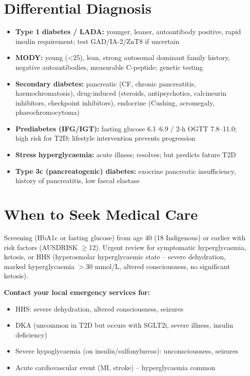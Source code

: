 \section*{Differential Diagnosis}
\begin{itemize}
    \item \textbf{Type 1 diabetes / LADA:} younger, leaner, autoantibody positive, rapid insulin requirement; test GAD/IA-2/ZnT8 if uncertain
    \item \textbf{MODY:} young (<25), lean, strong autosomal dominant family history, negative autoantibodies, measurable C-peptide; genetic testing
    \item \textbf{Secondary diabetes:} pancreatic (CF, chronic pancreatitis, haemochromatosis), drug-induced (steroids, antipsychotics, calcineurin inhibitors, checkpoint inhibitors), endocrine (Cushing, acromegaly, phaeochromocytoma)
    \item \textbf{Prediabetes (IFG/IGT):} fasting glucose 6.1--6.9 / 2-h OGTT 7.8--11.0; high risk for T2D; lifestyle intervention prevents progression
    \item \textbf{Stress hyperglycaemia:} acute illness; resolves; but predicts future T2D
    \item \textbf{Type 3c (pancreatogenic) diabetes:} exocrine pancreatic insufficiency, history of pancreatitis, low faecal elastase
\end{itemize}

\section*{When to Seek Medical Care}
Screening (HbA1c or fasting glucose) from age 40 (18 Indigenous) or earlier with risk factors (AUSDRISK $\ge$12). Urgent review for symptomatic hyperglycaemia, ketosis, or HHS (hyperosmolar hyperglycaemic state -- severe dehydration, marked hyperglycaemia $>$30 mmol/L, altered consciousness, no significant ketosis).

\textbf{Contact your local emergency services for:}
\begin{itemize}
    \item HHS: severe dehydration, altered consciousness, seizures
    \item DKA (uncommon in T2D but occurs with SGLT2i, severe illness, insulin deficiency)
    \item Severe hypoglycaemia (on insulin/sulfonylureas): unconsciousness, seizures
    \item Acute cardiovascular event (MI, stroke) -- hyperglycaemia common
\end{itemize}

